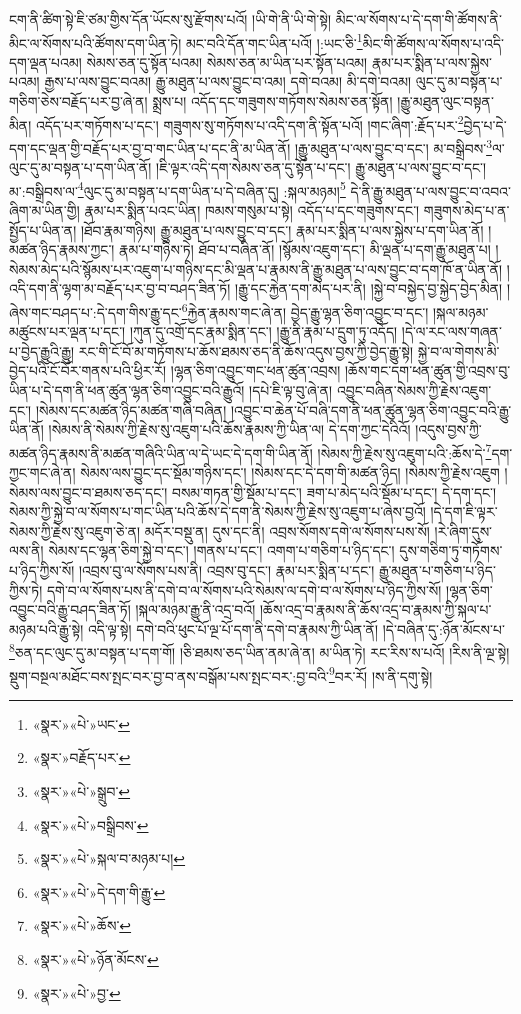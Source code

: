 ངག་ནི་ཚིག་སྟེ་ཇི་ཙམ་གྱིས་དོན་ཡོངས་སུ་རྫོགས་པའོ། །ཡི་གེ་ནི་ཡི་གེ་སྟེ། མིང་ལ་སོགས་པ་དེ་དག་གི་ཚོགས་ནི་མིང་ལ་སོགས་པའི་ཚོགས་དག་ཡིན་ཏེ། མང་བའི་དོན་གང་ཡིན་པའོ། །:ཡང་ཅི་\footnote{«སྣར་»«པེ་»ཡང་}མིང་གི་ཚོགས་ལ་སོགས་པ་འདི་དག་ལྡན་པའམ། སེམས་ཅན་དུ་སྟོན་པའམ། སེམས་ཅན་མ་ཡིན་པར་སྟོན་པའམ། རྣམ་པར་སྨིན་པ་ལས་སྐྱེས་པའམ། རྒྱས་པ་ལས་བྱུང་བའམ། རྒྱུ་མཐུན་པ་ལས་བྱུང་བ་འམ། དགེ་བའམ། མི་དགེ་བའམ། ལུང་དུ་མ་བསྟན་པ་གཅིག་ཅེས་བརྗོད་པར་བྱ་ཞེ་ན། སྨྲས་པ། འདོད་དང་གཟུགས་གཏོགས་སེམས་ཅན་སྟོན། །རྒྱུ་མཐུན་ལུང་བསྟན་མིན། འདོད་པར་གཏོགས་པ་དང་། གཟུགས་སུ་གཏོགས་པ་འདི་དག་ནི་སྟོན་པའོ། །གང་ཞིག་:རྗོད་པར་\footnote{«སྣར་»བརྗོད་པར་}བྱེད་པ་དེ་དག་དང་ལྡན་གྱི་བརྗོད་པར་བྱ་བ་གང་ཡིན་པ་དང་ནི་མ་ཡིན་ནོ། །རྒྱུ་མཐུན་པ་ལས་བྱུང་བ་དང་། མ་བསྒྲིབས་\footnote{«སྣར་»«པེ་»སྒྲུབ་}ལ་ལུང་དུ་མ་བསྟན་པ་དག་ཡིན་ནོ། །ཇི་ལྟར་འདི་དག་སེམས་ཅན་དུ་སྟོན་པ་དང་། རྒྱུ་མཐུན་པ་ལས་བྱུང་བ་དང་། མ་:བསྒྲིབས་ལ་\footnote{«སྣར་»«པེ་»བསྒྲིབས་}ལུང་དུ་མ་བསྟན་པ་དག་ཡིན་པ་དེ་བཞིན་དུ། :སྐལ་མཉམ།\footnote{«སྣར་»«པེ་»སྐལ་བ་མཉམ་པ།} དེ་ནི་རྒྱུ་མཐུན་པ་ལས་བྱུང་བ་འབའ་ཞིག་མ་ཡིན་གྱི། རྣམ་པར་སྨིན་པའང་ཡིན། ཁམས་གསུམ་པ་སྟེ། འདོད་པ་དང་གཟུགས་དང་། གཟུགས་མེད་པ་ན་སྤྱོད་པ་ཡིན་ན། །ཐོབ་རྣམ་གཉིས། རྒྱུ་མཐུན་པ་ལས་བྱུང་བ་དང་། རྣམ་པར་སྨིན་པ་ལས་སྐྱེས་པ་དག་ཡིན་ནོ། །མཚན་ཉིད་རྣམས་ཀྱང་། རྣམ་པ་གཉིས་ཏེ། ཐོབ་པ་བཞིན་ནོ། །སྙོམས་འཇུག་དང་། མི་ལྡན་པ་དག་རྒྱུ་མཐུན་པ། །སེམས་མེད་པའི་སྙོམས་པར་འཇུག་པ་གཉིས་དང་མི་ལྡན་པ་རྣམས་ནི་རྒྱུ་མཐུན་པ་ལས་བྱུང་བ་དག་ཁོ་ན་ཡིན་ནོ། །འདི་དག་ནི་ལྷག་མ་བརྗོད་པར་བྱ་བ་བཤད་ཟིན་ཏོ། །རྒྱུ་དང་རྐྱེན་དག་མེད་པར་ནི། །སྐྱེ་བ་བསྐྱེད་བྱ་སྐྱེད་བྱེད་མིན། །ཞེས་གང་བཤད་པ་:དེ་དག་གིས་རྒྱུ་དང་\footnote{«སྣར་»«པེ་»དེ་དག་གི་རྒྱུ་}རྐྱེན་རྣམས་གང་ཞེ་ན། བྱེད་རྒྱུ་ལྷན་ཅིག་འབྱུང་བ་དང་། །སྐལ་མཉམ་མཚུངས་པར་ལྡན་པ་དང་། །ཀུན་དུ་འགྲོ་དང་རྣམ་སྨིན་དང་། །རྒྱུ་ནི་རྣམ་པ་དྲུག་ཏུ་འདོད། །དེ་ལ་རང་ལས་གཞན་པ་བྱེད་རྒྱུའི་རྒྱུ། རང་གི་ངོ་བོ་མ་གཏོགས་པ་ཆོས་ཐམས་ཅད་ནི་ཆོས་འདུས་བྱས་ཀྱི་བྱེད་རྒྱུ་སྟེ། སྐྱེ་བ་ལ་གེགས་མི་བྱེད་པའི་ངོ་བོར་གནས་པའི་ཕྱིར་རོ། །ལྷན་ཅིག་འབྱུང་གང་ཕན་ཚུན་འབྲས། །ཆོས་གང་དག་ཕན་ཚུན་གྱི་འབྲས་བུ་ཡིན་པ་དེ་དག་ནི་ཕན་ཚུན་ལྷན་ཅིག་འབྱུང་བའི་རྒྱུའོ། །དཔེ་ཇི་ལྟ་བུ་ཞེ་ན། འབྱུང་བཞིན་སེམས་ཀྱི་རྗེས་འཇུག་དང་། །སེམས་དང་མཚན་ཉིད་མཚན་གཞི་བཞིན། །འབྱུང་བ་ཆེན་པོ་བཞི་དག་ནི་ཕན་ཚུན་ལྷན་ཅིག་འབྱུང་བའི་རྒྱུ་ཡིན་ནོ། །སེམས་ནི་སེམས་ཀྱི་རྗེས་སུ་འཇུག་པའི་ཆོས་རྣམས་ཀྱི་ཡིན་ལ། དེ་དག་ཀྱང་དེའིའོ། །འདུས་བྱས་ཀྱི་མཚན་ཉིད་རྣམས་ནི་མཚན་གཞིའི་ཡིན་ལ་དེ་ཡང་དེ་དག་གི་ཡིན་ནོ། །སེམས་ཀྱི་རྗེས་སུ་འཇུག་པའི་:ཆོས་དེ་\footnote{«སྣར་»«པེ་»ཆོས་}དག་ཀྱང་གང་ཞེ་ན། སེམས་ལས་བྱུང་དང་སྡོམ་གཉིས་དང་། །སེམས་དང་དེ་དག་གི་མཚན་ཉིད། །སེམས་ཀྱི་རྗེས་འཇུག །སེམས་ལས་བྱུང་བ་ཐམས་ཅད་དང་། བསམ་གཏན་གྱི་སྡོམ་པ་དང་། ཟག་པ་མེད་པའི་སྡོམ་པ་དང་། དེ་དག་དང་། སེམས་ཀྱི་སྐྱེ་བ་ལ་སོགས་པ་གང་ཡིན་པའི་ཆོས་དེ་དག་ནི་སེམས་ཀྱི་རྗེས་སུ་འཇུག་པ་ཞེས་བྱའོ། །དེ་དག་ཇི་ལྟར་སེམས་ཀྱི་རྗེས་སུ་འཇུག་ཅེ་ན། མདོར་བསྡུ་ན། དུས་དང་ནི། འབྲས་སོགས་དགེ་ལ་སོགས་པས་སོ། །རེ་ཞིག་དུས་ལས་ནི། སེམས་དང་ལྷན་ཅིག་སྐྱེ་བ་དང་། །གནས་པ་དང་། འགག་པ་གཅིག་པ་ཉིད་དང་། དུས་གཅིག་ཏུ་གཏོགས་པ་ཉིད་ཀྱིས་སོ། །འབྲས་བུ་ལ་སོགས་པས་ནི། འབྲས་བུ་དང་། རྣམ་པར་སྨིན་པ་དང་། རྒྱུ་མཐུན་པ་གཅིག་པ་ཉིད་ཀྱིས་ཏེ། དགེ་བ་ལ་སོགས་པས་ནི་དགེ་བ་ལ་སོགས་པའི་སེམས་ལ་དགེ་བ་ལ་སོགས་པ་ཉིད་ཀྱིས་སོ། །ལྷན་ཅིག་འབྱུང་བའི་རྒྱུ་བཤད་ཟིན་ཏོ། །སྐལ་མཉམ་རྒྱུ་ནི་འདྲ་བའོ། །ཆོས་འདྲ་བ་རྣམས་ནི་ཆོས་འདྲ་བ་རྣམས་ཀྱི་སྐལ་པ་མཉམ་པའི་རྒྱུ་སྟེ། འདི་ལྟ་སྟེ། དགེ་བའི་ཕུང་པོ་ལྔ་པོ་དག་ནི་དགེ་བ་རྣམས་ཀྱི་ཡིན་ནོ། །དེ་བཞིན་དུ་:ཉོན་མོངས་པ་\footnote{«སྣར་»«པེ་»ཉོན་མོངས་}ཅན་དང་ལུང་དུ་མ་བསྟན་པ་དག་གོ། །ཅི་ཐམས་ཅད་ཡིན་ནམ་ཞེ་ན། མ་ཡིན་ཏེ། རང་རིས་ས་པའོ། །རིས་ནི་ལྔ་སྟེ། སྡུག་བསྔལ་མཐོང་བས་སྤང་བར་བྱ་བ་ནས་བསྒོམ་པས་སྤང་བར་:བྱ་བའི་\footnote{«སྣར་»«པེ་»བྱ་}བར་རོ། །ས་ནི་དགུ་སྟེ། 